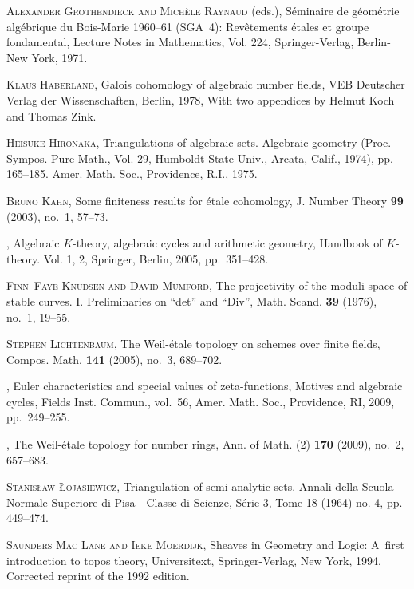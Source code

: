 \documentclass[leqno,12pt]{article}
\theoremstyle{plain}
\theoremstyle{definition}
\begin{document}
\begin{thebibliography}{99}
  \textsc{Alexander Grothendieck and Mich\`ele Raynaud} (eds.), S{\'e}minaire de
  g{\'e}om{\'e}trie alg{\'e}brique du {B}ois-{M}arie 1960--61 ({SGA}~4):
  Rev\^etements \'etales et groupe fondamental, Lecture Notes in Mathematics,
  Vol. 224, Springer-Verlag, Berlin-New York, 1971.

  \textsc{Klaus Haberland}, Galois cohomology of algebraic number fields, VEB
  Deutscher Verlag der Wissenschaften, Berlin, 1978, With two appendices by
  Helmut Koch and Thomas Zink.

  \textsc{Heisuke Hironaka}, Triangulations of algebraic sets. Algebraic
  geometry (Proc. Sympos. Pure Math., Vol. 29, Humboldt State Univ., Arcata,
  Calif., 1974), pp. 165--185. Amer. Math. Soc., Providence, R.I., 1975.

  \textsc{Bruno Kahn}, Some finiteness results for \'{e}tale cohomology,
  J. Number Theory \textbf{99} (2003), no.~1, 57--73.

  \bysame, Algebraic {$K$}-theory, algebraic cycles and arithmetic
  geometry, Handbook of {$K$}-theory. {V}ol. 1, 2, Springer, Berlin, 2005,
  pp.~351--428.

  \textsc{Finn~Faye Knudsen and David Mumford}, The projectivity of the moduli space
  of stable curves. {I}. {P}reliminaries on ``det'' and ``{D}iv'', Math.
  Scand. \textbf{39} (1976), no.~1, 19--55.

  \textsc{Stephen Lichtenbaum}, The {W}eil-\'{e}tale topology on schemes over finite
  fields, Compos. Math. \textbf{141} (2005), no.~3, 689--702.

  \bysame, Euler characteristics and special values of zeta-functions,
  Motives and algebraic cycles, Fields Inst. Commun., vol.~56, Amer. Math.
  Soc., Providence, RI, 2009, pp.~249--255.

  \bysame, The {W}eil-\'{e}tale topology for number rings, Ann. of Math.
  (2) \textbf{170} (2009), no.~2, 657--683.

  \textsc{Stanis\l{}aw \L{}ojasiewicz}, Triangulation of semi-analytic sets. Annali della Scuola Normale Superiore di Pisa - Classe di Scienze, S\'{e}rie 3, Tome 18 (1964) no. 4, pp. 449--474.

  \textsc{Saunders Mac Lane and Ieke Moerdijk},
  Sheaves in Geometry and Logic: A~first introduction to topos theory,
  Universitext, Springer-Verlag, New York, 1994,
  Corrected reprint of the 1992 edition.


\end{thebibliography}
\end{document}
